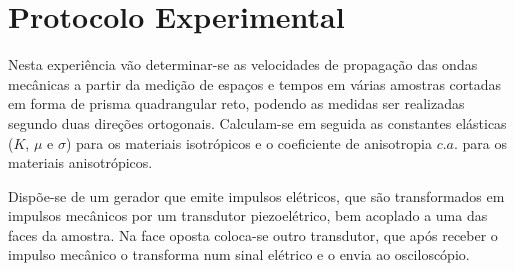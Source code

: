 \documentclass[a4paper,12pt]{article}
\begin{document}



\newpage
\section{\sf Protocolo Experimental}
Nesta experiência vão determinar-se as velocidades de propagação das ondas mecânicas a partir da medição de espaços e tempos em várias amostras cortadas em forma de prisma quadrangular reto, podendo as medidas ser realizadas segundo duas direções ortogonais.
 Calculam-se em seguida as constantes elásticas ($K$, $\mu$ e $\sigma$) para os materiais isotrópicos e o coeficiente de anisotropia $c.a.$ para os materiais anisotrópicos.
 
Dispõe-se de um gerador que emite impulsos elétricos, que são transformados em impulsos mecânicos por um transdutor piezoelétrico, bem acoplado a uma das faces da amostra. Na face oposta coloca-se outro transdutor, que após receber o impulso mecânico o transforma num sinal elétrico e o envia ao osciloscópio.
\end{document}
